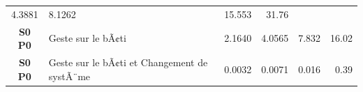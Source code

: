 \documentclass[]{article}
\begin{document}
\begin{longtable}[]{@{}clrrrr@{}}
\begin{minipage}[t]{0.09\columnwidth}
4.3881\strut
\end{minipage} & \begin{minipage}[t]{0.09\columnwidth}\raggedleft\strut
8.1262\strut
\end{minipage} & \begin{minipage}[t]{0.09\columnwidth}\raggedleft\strut
15.553\strut
\end{minipage} & \begin{minipage}[t]{0.09\columnwidth}\raggedleft\strut
31.76\strut
\end{minipage}\tabularnewline
\begin{minipage}[t]{0.17\columnwidth}\centering\strut
\textbf{S0 P0}\strut
\end{minipage} & \begin{minipage}[t]{0.29\columnwidth}\raggedright\strut
Geste sur le bÃ¢ti\strut
\end{minipage} & \begin{minipage}[t]{0.09\columnwidth}\raggedleft\strut
2.1640\strut
\end{minipage} & \begin{minipage}[t]{0.09\columnwidth}\raggedleft\strut
4.0565\strut
\end{minipage} & \begin{minipage}[t]{0.09\columnwidth}\raggedleft\strut
7.832\strut
\end{minipage} & \begin{minipage}[t]{0.09\columnwidth}\raggedleft\strut
16.02\strut
\end{minipage}\tabularnewline
\begin{minipage}[t]{0.17\columnwidth}\centering\strut
\textbf{S0 P0}\strut
\end{minipage} & \begin{minipage}[t]{0.29\columnwidth}\raggedright\strut
Geste sur le bÃ¢ti et Changement de systÃ¨me\strut
\end{minipage} & \begin{minipage}[t]{0.09\columnwidth}\raggedleft\strut
0.0032\strut
\end{minipage} & \begin{minipage}[t]{0.09\columnwidth}\raggedleft\strut
0.0071\strut
\end{minipage} & \begin{minipage}[t]{0.09\columnwidth}\raggedleft\strut
0.016\strut
\end{minipage} & \begin{minipage}[t]{0.09\columnwidth}\raggedleft\strut
0.39\strut
\end{minipage}\tabularnewline

\end{longtable}
\end{document}
